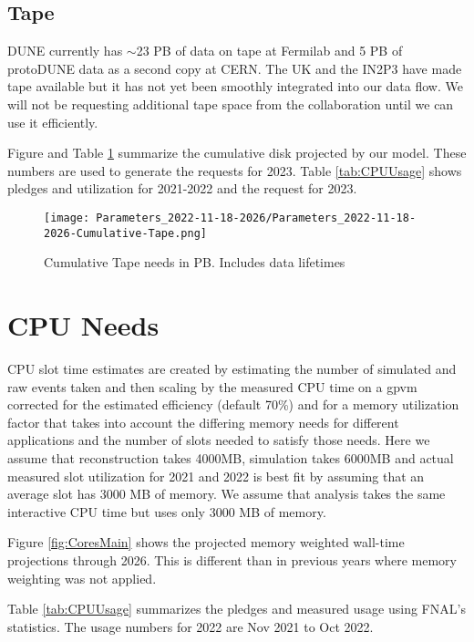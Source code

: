 \documentclass[12pt]{article}
\begin{document}
\subsection{Tape}

DUNE currently has $\sim$23 PB of data on tape at Fermilab and 5 PB of protoDUNE data as a second copy at CERN.  The UK and the IN2P3 have made tape available but it has not yet been smoothly integrated into our data flow.  We will not be requesting additional tape space from the collaboration until we can use it efficiently. 

Figure and Table  \ref{fig:Cumulative-Tape}  summarize the cumulative disk projected by our model. These numbers are used to generate the requests for 2023. Table \ref{tab:CPUUsage} shows pledges and utilization for 2021-2022 and the request for 2023.

\begin{figure}[h]
\centering\texttt{[image: Parameters\_2022-11-18-2026/Parameters\_2022-11-18-2026-Cumulative-Tape.png]}

\caption{Cumulative Tape needs in PB. Includes data lifetimes}\label{fig:Cumulative-Tape}
\end{figure}

\section{CPU Needs}

CPU  slot time estimates are created by estimating the number of simulated and raw events taken and then scaling by the measured CPU time on a gpvm corrected for the estimated efficiency (default 70\%) and for a memory utilization factor that takes into account the differing memory needs for different applications and the number of slots needed to satisfy those needs.  Here we assume that reconstruction takes 4000MB, simulation takes 6000MB and actual measured  slot utilization for 2021 and 2022 is best fit by assuming that an average slot has 3000 MB of memory.    We assume that analysis takes the same interactive CPU time but uses only 3000 MB of memory.  

Figure \ref{fig:CoresMain} shows the projected memory weighted wall-time projections through 2026.  This is different than in previous years where memory weighting was not applied. 

Table \ref{tab:CPUUsage} summarizes the pledges\cite{CCB2022} and measured usage using FNAL's statistics\cite{fifemonDUNE}.  The  usage numbers for 2022 are Nov 2021 to Oct 2022. 
\end{document}
